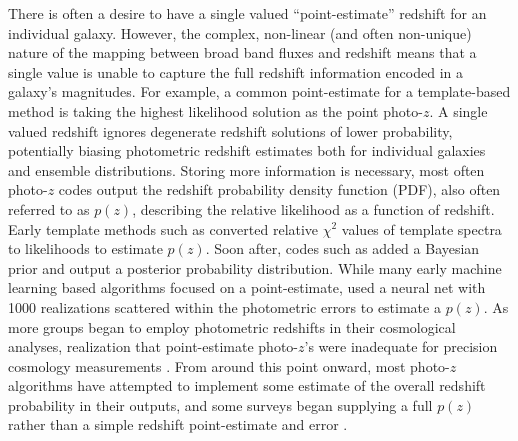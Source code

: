There is often a desire to have a single valued ``point-estimate'' redshift for an individual galaxy.  However, the complex, non-linear (and often non-unique) nature of the mapping between broad band fluxes and redshift means that a single value is unable to capture the full redshift information encoded in a galaxy's magnitudes.  For example, a common point-estimate for a template-based method is taking the highest likelihood solution as the point photo-$z$.  A single valued redshift ignores degenerate redshift solutions of lower probability, potentially biasing photometric redshift estimates both for individual galaxies and ensemble distributions.  Storing more information is necessary, most often photo-$z$ codes output the redshift probability density function (PDF), also often referred to as $p(z)$, describing the relative likelihood as a function of redshift. %
Early template methods such as \citet{Fernandezsoto:99} converted relative $\chi^2$ values of template spectra to likelihoods to estimate $p(z)$.
Soon after, codes such as \citet{Benitez:00} added a Bayesian prior and output a posterior probability distribution.
While many early machine learning based algorithms focused on a point-estimate, \citet{Firth:03} used a neural net with 1000 realizations scattered within the photometric errors to estimate a $p(z)$.
As more groups began to employ photometric redshifts in their cosmological analyses, realization that point-estimate photo-$z$'s were inadequate for precision cosmology measurements \citep{Mandelbaum:2008}.
From around this point onward, most photo-$z$ algorithms have attempted to implement some estimate of the overall redshift probability in their outputs, and some surveys began supplying a full $p(z)$ rather than a simple redshift point-estimate and error \citep[e.~g.~][]{de_Jong:17}.


